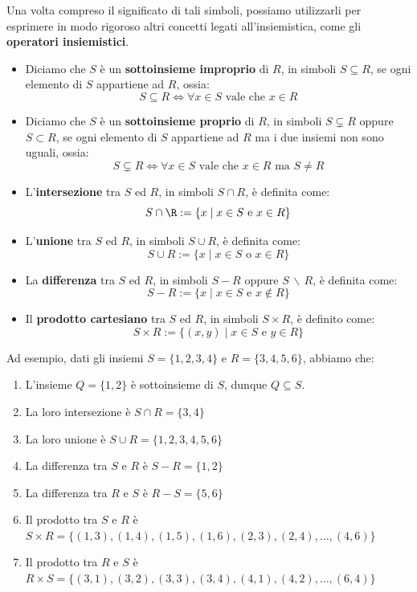 \documentclass[a4paper, 12pt]{report}
\begin{document}
    Una volta compreso il significato di tali simboli, possiamo utilizzarli per esprimere in modo rigoroso altri concetti legati all'insiemistica, come gli \textbf{operatori insiemistici}.
    \begin{itemize}
        \item Diciamo che $S$ è un \textbf{sottoinsieme improprio} di $R$, in simboli $S \subseteq R$, se ogni elemento di $S$ appartiene ad $R$, ossia:
        \[S \subseteq R \iff \forall x \in S \text{ vale che } x \in R\]
        \item Diciamo che $S$ è un \textbf{sottoinsieme proprio} di $R$, in simboli $S \subsetneq R$ oppure $S \subset R$, se ogni elemento di $S$ appartiene ad $R$ ma i due insiemi non sono uguali, ossia:
        \[S \subsetneq R \iff \forall x \in S \text{ vale che } x \in R \text{ ma } S \neq R\]
        \item L'\textbf{intersezione} tra $S$ ed $R$, in simboli $S \cap R$, è definita come:
        \[S \cap \R := \{x \mid x \in S \text{ e } x \in R\}\]
        \item L'\textbf{unione} tra $S$ ed $R$, in simboli $S \cup R$, è definita come:
        \[S \cup R := \{x \mid x \in S \text{ o } x \in R\}\]
        \item La \textbf{differenza} tra $S$ ed $R$, in simboli $S - R$ oppure $S \,\backslash\, R$, è definita come:
        \[S - R := \{x \mid x \in S \text{ e } x \notin R\}\]
        \item Il \textbf{prodotto cartesiano} tra $S$ ed $R$, in simboli $S \times R$, è definito come:
        \[S \times R := \{(x,y) \mid x \in S \text{ e } y \in R\}\]
    \end{itemize}

    Ad esempio, dati gli insiemi $S = \{1,2,3,4\}$ e $R = \{3,4,5,6\}$, abbiamo che:
    \begin{enumerate}
        \item L'insieme $Q = \{1,2\}$ è sottoinsieme di $S$, dunque $Q \subseteq S$.
        \item La loro intersezione è $S \cap R = \{3,4\}$
        \item La loro unione è $S \cup R = \{1,2,3,4,5,6\}$
        \item La differenza tra $S$ e $R$ è $S - R = \{1,2\}$
        \item La differenza tra $R$ e $S$ è $R - S = \{5,6\}$
        \item Il prodotto tra $S$ e $R$ è $S \times R = \{(1,3), (1,4), (1,5), (1,6), (2,3), (2,4), \ldots, (4,6)\}$
        \item Il prodotto tra $R$ e $S$ è $R \times S = \{(3,1), (3,2), (3,3), (3,4), (4,1), (4,2), \ldots, (6,4)\}$
    \end{enumerate}
\end{document}
